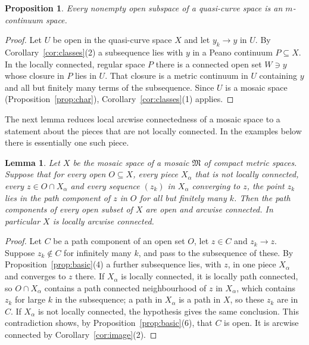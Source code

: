 \documentclass[11pt]{amsart}
\newtheorem{lemma}[theorem]{Lemma}
\newtheorem{proposition}[theorem]{Proposition}
\theoremstyle{definition}
\theoremstyle{remark}
\newcommand{\fM}{\mathfrak{M}}
\numberwithin{equation}{section}
\begin{document}
\begin{proposition}\label{prop:qcopen}
Every nonempty open subspace of a quasi-curve space is an $m$-continuum space.
\end{proposition}
\begin{proof}
Let $U$ be open in the quasi-curve space $X$ and let $y_k\to y$ in $U$. By Corollary~\ref{cor:classes}(2) a subsequence lies with $y$ in a Peano continuum $P\subseteq X$. In the locally connected, regular space $P$ there is a connected open set $W\ni y$ whose closure in $P$ lies in $U$. That closure is a metric continuum in $U$ containing $y$ and all but finitely many terms of the subsequence. Since $U$ is a mosaic space (Proposition~\ref{prop:char}), Corollary~\ref{cor:classes}(1) applies.
\end{proof}

The next lemma reduces local arcwise connectedness of a mosaic space to a statement about the pieces that are not locally connected. In the examples below there is essentially one such piece.

\begin{lemma}\label{lem:lac}
Let $X$ be the mosaic space of a mosaic $\fM$ of compact metric spaces. Suppose that for every open $O\subseteq X$, every piece $X_\alpha$ that is not locally connected, every $z\in O\cap X_\alpha$ and every sequence $(z_k)$ in $X_\alpha$ converging to $z$, the point $z_k$ lies in the path component of $z$ in $O$ for all but finitely many $k$. Then the path components of every open subset of $X$ are open and arcwise connected. In particular $X$ is locally arcwise connected.
\end{lemma}
\begin{proof}
Let $C$ be a path component of an open set $O$, let $z\in C$ and $z_k\to z$. Suppose $z_k\notin C$ for infinitely many $k$, and pass to the subsequence of these. By Proposition~\ref{prop:basic}(4) a further subsequence lies, with $z$, in one piece $X_\alpha$ and converges to $z$ there. If $X_\alpha$ is locally connected, it is locally path connected, so $O\cap X_\alpha$ contains a path connected neighbourhood of $z$ in $X_\alpha$, which contains $z_k$ for large $k$ in the subsequence; a path in $X_\alpha$ is a path in $X$, so these $z_k$ are in $C$. If $X_\alpha$ is not locally connected, the hypothesis gives the same conclusion. This contradiction shows, by Proposition~\ref{prop:basic}(6), that $C$ is open. It is arcwise connected by Corollary~\ref{cor:image}(2).
\end{proof}
\end{document}
